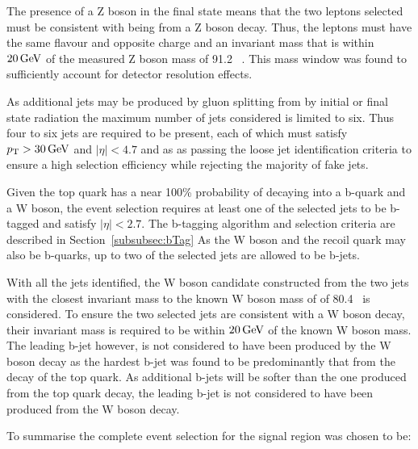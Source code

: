 The presence of a Z boson in the final state means that the two leptons selected must be consistent with being from a Z boson decay.
Thus, the leptons must have the same flavour and opposite charge and an invariant mass that is within $20\,\text{Ge\hspace{-.08em}V}$ of the measured Z boson mass of 91.2 \GeV~\cite{Tanabashi:2018oca}.
This mass window was found to sufficiently account for detector resolution effects.

As additional jets may be produced by gluon splitting from by initial or final state radiation the maximum number of jets considered is limited to six.
Thus four to six jets are required to be present, each of which must satisfy $p_{\mathrm{T}} > 30\,\text{Ge\hspace{-.08em}V}$ and $|\eta| < 4.7$ and as as passing the loose jet identification criteria to ensure a high selection efficiency while rejecting the majority of fake jets.

Given the top quark has a near 100\% probability of decaying into a b-quark and a W boson, the event selection requires at least one of the selected jets to be b-tagged and satisfy $|\eta| < 2.7$.
The b-tagging algorithm and selection criteria are described in Section~\ref{subsubsec:bTag}
As the W boson and the recoil quark may also be b-quarks, up to two of the selected jets are allowed to be b-jets.

With all the jets identified, the W boson candidate constructed from the two jets with the closest invariant mass to the known W boson mass of of 80.4\GeVcc~\cite{Tanabashi:2018oca} is considered.
To ensure the two selected jets are consistent with a W boson decay, their invariant mass is required to be within $20\,\text{Ge\hspace{-.08em}V}$ of the known W boson mass.
The leading b-jet however, is not considered to have been produced by the W boson decay as the hardest b-jet was found to be predominantly that from the decay of the top quark.
As additional b-jets will be softer than the one produced from the top quark decay, the leading b-jet is not considered to have been produced from the W boson decay.

To summarise the complete event selection for the signal region was chosen to be:

